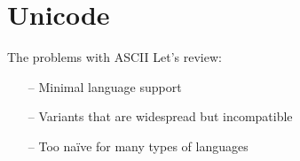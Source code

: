 \documentclass[../index.tex]{subfiles}
\begin{document}
\renewcommand{\sectiontitle}{Unicode}
\section{\sectiontitle}
%
%

\renewcommand{\currenttitle}{The problems with ASCII}
\begin{frame}{\currenttitle}
%
%
%
  Let's review: \\

  \begin{itemize}
    \item[--] Minimal language support
    \item[--] Variants that are widespread but incompatible
    \item[--] Too naïve for many types of languages
  \end{itemize}
\end{frame}
\end{document}
